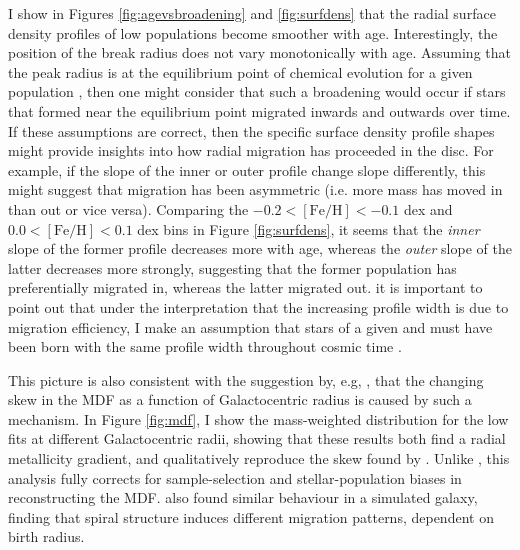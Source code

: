 I show in Figures \ref{fig:agevsbroadening} and \ref{fig:surfdens}  that the radial surface density profiles of low \afe{} populations become smoother with age. Interestingly, the position of the break radius does not vary monotonically with age. Assuming that the peak radius is at the equilibrium point of chemical evolution for a given population  \citep[where the consumption of gas and its dilution are balanced, as discussed in][]{2016ApJ...823...30B}, then one might consider that such a broadening would occur if stars that formed near the equilibrium point migrated inwards and outwards over time.  If these assumptions are correct, then the specific surface density profile shapes might provide insights into how radial migration has proceeded in the disc. For example, if the slope of the inner or outer profile change slope differently, this might suggest that migration has been asymmetric (i.e. more mass has moved in than out or vice versa). Comparing the $-0.2 <\mathrm{[Fe/H]}<-0.1$ dex and $0.0 <\mathrm{[Fe/H]}<0.1$ dex bins in Figure \ref{fig:surfdens}, it seems that the \emph{inner} slope of the former profile decreases more with age, whereas the \emph{outer} slope of the latter decreases more strongly, suggesting that the former population has preferentially migrated in, whereas the latter migrated out.  it is important to point out that under the interpretation that the increasing profile width is due to migration efficiency, I make an assumption that stars of a given \feh{} and \afe{} must have been born with the same profile width throughout cosmic time \citep[as discussed by, e.g.][]{2017ApJ...834...27M}.


This picture is also consistent with the suggestion by, e.g, \citet[][]{2015ApJ...808..132H,2011ApJ...737....8L}, that the changing skew in the MDF as a function of Galactocentric radius is caused by such a mechanism. In Figure \ref{fig:mdf}, I show the mass-weighted \feh{} distribution for the low \afe{} fits at different Galactocentric radii, showing that these results both find a radial metallicity gradient, and qualitatively reproduce the skew found by \citet[][]{2015ApJ...808..132H}. Unlike \citet[][]{2015ApJ...808..132H}, this analysis fully corrects for sample-selection and stellar-population biases in reconstructing the MDF. \citet{2016MNRAS.460L..94G} also found similar behaviour in a simulated galaxy, finding that spiral structure induces different migration patterns, dependent on birth radius. 

